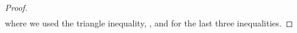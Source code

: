 \begin{proof}
\begin{align*}
    \end{align*}
    where we used the triangle inequality, , and  for the last three inequalities.
\end{proof}

